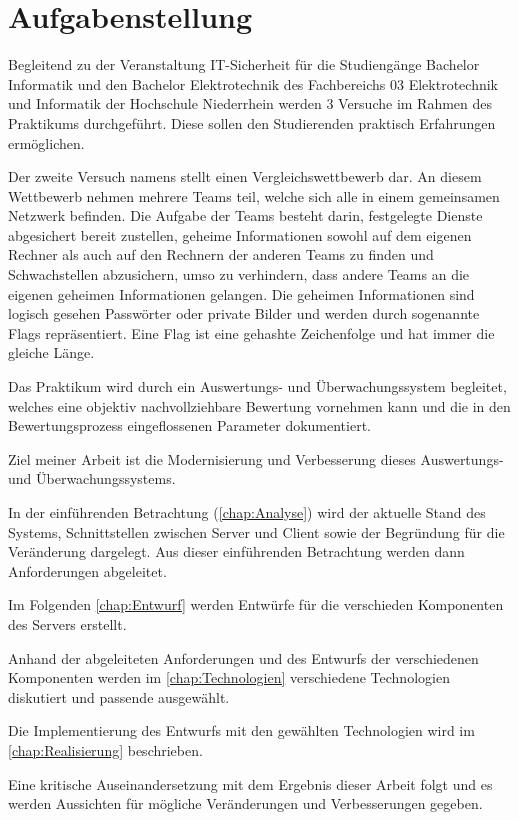 \section{Aufgabenstellung}
\label{sec:Aufgabenstellung}
Begleitend zu der Veranstaltung IT-Sicherheit für die Studiengänge Bachelor Informatik und den Bachelor Elektrotechnik des Fachbereichs 03 Elektrotechnik und Informatik der Hochschule Niederrhein werden 3 Versuche im Rahmen des Praktikums durchgeführt. Diese sollen den Studierenden praktisch Erfahrungen ermöglichen.

Der zweite Versuch namens  stellt einen Vergleichswettbewerb dar. An diesem Wettbewerb nehmen mehrere Teams teil, welche sich alle in einem gemeinsamen Netzwerk befinden. Die Aufgabe der Teams besteht darin, festgelegte Dienste abgesichert bereit zustellen, geheime Informationen sowohl auf dem eigenen Rechner als auch auf den Rechnern der anderen Teams zu finden und Schwachstellen abzusichern, umso zu verhindern, dass andere Teams an die eigenen geheimen Informationen gelangen.\cite[S. 2]{sosnaKonzeptionUndRealisierung2010} Die geheimen Informationen sind logisch gesehen Passwörter oder private Bilder und werden durch sogenannte Flags repräsentiert. Eine Flag ist eine gehashte Zeichenfolge und hat immer die gleiche Länge.

Das Praktikum wird durch ein Auswertungs- und Überwachungssystem begleitet, welches eine objektiv nachvollziehbare Bewertung vornehmen kann und die in den Bewertungsprozess eingeflossenen Parameter dokumentiert.\cite[S. 2]{sosnaKonzeptionUndRealisierung2010}

Ziel meiner Arbeit ist die Modernisierung und Verbesserung dieses Auswertungs- und Überwachungssystems.

In der einführenden Betrachtung (\autoref{chap:Analyse}) wird der aktuelle Stand des Systems, Schnittstellen zwischen Server und Client sowie der Begründung für die Veränderung dargelegt. Aus dieser einführenden Betrachtung werden dann Anforderungen abgeleitet.

Im Folgenden \autoref{chap:Entwurf} werden Entwürfe für die verschieden Komponenten des Servers erstellt. 

Anhand der abgeleiteten Anforderungen und des Entwurfs der verschiedenen Komponenten werden im \autoref{chap:Technologien} verschiedene Technologien diskutiert und passende ausgewählt.

Die Implementierung des Entwurfs mit den gewählten Technologien wird im \autoref{chap:Realisierung} beschrieben.

Eine kritische Auseinandersetzung mit dem Ergebnis dieser Arbeit folgt und es werden Aussichten für mögliche Veränderungen und Verbesserungen gegeben.